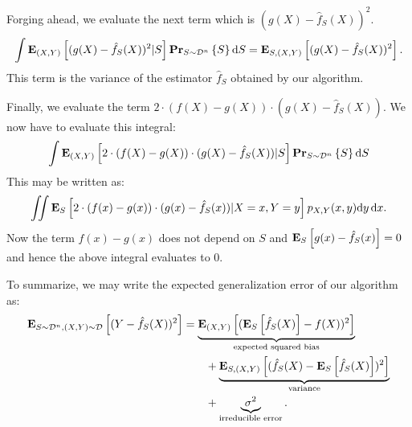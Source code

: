 Forging ahead, we evaluate the next term which is $(g(X) - \hat{f}_S(X))^2$.
\begin{equation}
    \int \mathbf{E}_{(X, Y)} \left [ (g(X) - \hat{f}_S(X))^2 \vert S \right ] \mathbf{Pr}_{S \sim \mathcal{D}^n} \left \{ S \right \} \text{d} S
    = \mathbf{E}_{S, (X, Y)} \left [ (g(X) - \hat{f}_S(X))^2 \right ].
\end{equation}
This term is the variance of the estimator $\hat{f}_S$ obtained by our algorithm.

Finally, we evaluate the term $2 \cdot (f(X) - g(X)) \cdot (g(X) - \hat{f}_S(X))$. We now
have to evaluate this integral:
\begin{equation}
    \int \mathbf{E}_{(X, Y)} \left [ 2 \cdot (f(X) - g(X)) \cdot (g(X) - \hat{f}_S(X)) \vert S \right ] \mathbf{Pr}_{S \sim \mathcal{D}^n} \left \{ S \right \} \text{d} S
\end{equation}
This may be written as:
\begin{equation}
    \iint \mathbf{E}_{S} \left [ 2 \cdot (f(x) - g(x)) \cdot (g(x) - \hat{f}_S(x)) \vert X = x, Y = y \right ] p_{X, Y}(x, y) \text{d} y \, \text{d} x.
\end{equation}
Now the term $f(x) - g(x)$ does not depend on $S$ and $\mathbf{E}_{S} \left [ g(x) - \hat{f}_S(x) \right ] = 0$
and hence the above integral evaluates to $0$.

To summarize, we may write the expected generalization error of our algorithm
as:
\begin{align*}
    \mathbf{E}_{S \sim \mathcal{D}^n, (X, Y) \sim \mathcal{D}} \left [ (Y - \hat{f}_S(X))^2 \right ]
        & =  \underbrace{\mathbf{E}_{(X, Y)} \left [ (\mathbf{E}_{S} \left [ \hat{f}_S(X) \right ] - f(X) )^2 \right ]}_{\text{expected squared bias}}  \\
        & \quad \quad + \underbrace{\mathbf{E}_{S, (X, Y)} \left [ ( \hat{f}_S(X) - \mathbf{E}_{S} \left [ \hat{f}_S(X) \right ] )^2 \right ]}_{\text{variance}} \\
        & \quad \quad + \underbrace{\sigma^2}_{\text{irreducible error}}.
\end{align*}
